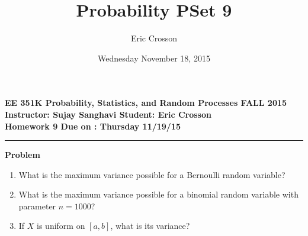 \documentclass[11pt]{article}
\author{Eric Crosson}
\date{Wednesday November 18, 2015}
\title{Probability PSet 9}
\newcounter{problem}
\newcounter{solution}
\newcommand\Problem{%
  \stepcounter{problem}%
  \textbf{Problem \theproblem}~%
  \setcounter{solution}{0}%
}
\begin{document}
\textbf{EE 351K Probability, Statistics, and Random Processes \hfill{} FALL 2015 \\
  Instructor: Sujay Sanghavi \hfill{} Student: Eric Crosson \\
  Homework 9 \hfill{} Due on : Thursday 11/19/15
}
\rule{\textwidth}{1pt}

\Problem
\begin{enumerate}
  \item What is the maximum variance possible for a Bernoulli random variable?
  \item What is the maximum variance possible for a binomial random variable
    with parameter $n=1000$?
  \item If $X$ is uniform on $[a,b]$, what is its variance?
\end{enumerate}
\end{document}
